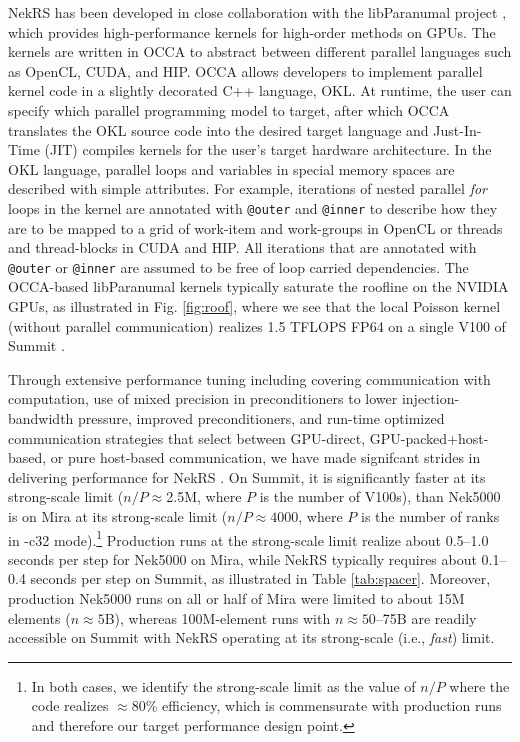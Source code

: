 NekRS has been developed in close collaboration with the libParanumal project
\cite{warburton2019,warburton2019b,ChalmersKarakusAustinSwirydowiczWarburton2020,streamParanumal2020},
which provides high-performance kernels for high-order methods on GPUs.  The
kernels are written in OCCA to abstract between different parallel languages
such as OpenCL, CUDA, and HIP. OCCA allows developers to implement parallel
kernel code in a slightly decorated C++ language, OKL.  At runtime, the user
can specify which parallel programming model to target, after which OCCA
translates the OKL source code into the desired target language and
Just-In-Time (JIT) compiles kernels for the user's target hardware
architecture.  In the OKL language, parallel loops and variables in special
memory spaces are described with simple attributes. For example, iterations of
nested parallel {\em for} loops in the kernel are annotated with
\texttt{@outer} and \texttt{@inner} to describe how they are to be mapped to a
grid of work-item and work-groups in OpenCL or threads and thread-blocks in
CUDA and HIP. All iterations that are annotated with \texttt{@outer} or
\texttt{@inner} are assumed to be free of loop carried dependencies. 
The OCCA-based libParanumal kernels
typically saturate the roofline on the NVIDIA GPUs, as illustrated
in Fig. \ref{fig:roof}, where we see that the local Poisson kernel
(without parallel communication) realizes 1.5 TFLOPS FP64 on a single V100
of Summit \cite{ceed_bp_paper_2020}.

Through extensive performance tuning including covering communication with
computation, use of mixed precision in preconditioners to lower
injection-bandwidth pressure, improved preconditioners, and run-time optimized
communication strategies that select between GPU-direct, GPU-packed+host-based,
or pure host-based communication, we have made signifcant strides in delivering
performance for NekRS \cite{nekrs}.  On Summit, it is significantly faster at
its strong-scale limit ($n/P \approx $2.5M, where $P$ is the number of V100s),
than Nek5000 is on Mira at its strong-scale limit ($n/P \approx 4000$, where $P$
is the number of ranks in -c32 mode).\footnote{In both cases, we identify the
strong-scale limit as the value of $n/P$ where the code realizes $\approx$80\%
efficiency, which is commensurate with production runs and therefore our
target performance design point.}  Production runs at the strong-scale
limit realize about 0.5--1.0 seconds per step for Nek5000 on Mira, while NekRS
typically requires about 0.1--0.4 seconds per step on Summit,  as illustrated
in Table \ref{tab:spacer}.  Moreover, production Nek5000 runs on all or half of
Mira were limited to about 15M elements ($n \approx 5$B), whereas 100M-element
runs with $n \approx 50$--75B are readily accessible on Summit with NekRS
operating at its strong-scale (i.e., {\em fast}) limit.

